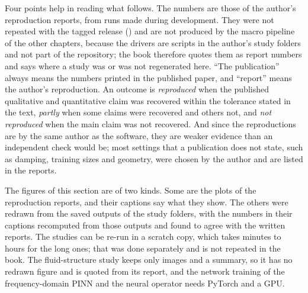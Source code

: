 Four points help in reading what follows. The numbers are those of the author's reproduction reports, from runs made during development. They were not repeated with the tagged release (\booktag{}) and are not produced by the macro pipeline of the other chapters, because the drivers are scripts in the author's study folders and not part of the repository; the book therefore quotes them as report numbers and says where a study was or was not regenerated here. ``The publication'' always means the numbers printed in the published paper, and ``report'' means the author's reproduction. An outcome is \emph{reproduced} when the published qualitative and quantitative claim was recovered within the tolerance stated in the text, \emph{partly} when some claims were recovered and others not, and \emph{not reproduced} when the main claim was not recovered. And since the reproductions are by the same author as the software, they are weaker evidence than an independent check would be; most settings that a publication does not state, such as damping, training sizes and geometry, were chosen by the author and are listed in the reports.

The figures of this section are of two kinds. Some are the plots of the reproduction reports, and their captions say what they show. The others were redrawn from the saved outputs of the study folders, with the numbers in their captions recomputed from those outputs and found to agree with the written reports. The studies can be re-run in a scratch copy, which takes minutes to hours for the long ones; that was done separately and is not repeated in the book. The fluid-structure study keeps only images and a summary, so it has no redrawn figure and is quoted from its report, and the network training of the frequency-domain PINN and the neural operator needs PyTorch and a GPU.

